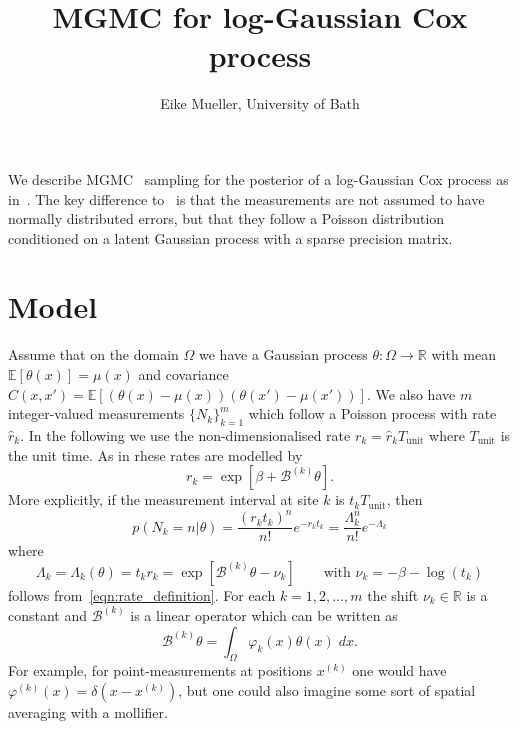 \documentclass[11pt]{article}
\title{MGMC for log-Gaussian Cox process}
\author{Eike Mueller, University of Bath}
\begin{document}
\maketitle
We describe MGMC~\cite{goodman1989multigrid} sampling for the posterior of a log-Gaussian Cox process as in~\cite{diggle1998model}. The key difference to~\cite{kazashi2026multigrid} is that the measurements are not assumed to have normally distributed errors, but that they follow a Poisson distribution conditioned on a latent Gaussian process with a sparse precision matrix.
\section{Model}
Assume that on the domain $\Omega$ we have a Gaussian process $\theta:\Omega\rightarrow \mathbb{R}$ with mean $\mathbb{E}[\theta(x)]=\mu(x)$ and covariance $C(x,x')=\mathbb{E}[(\theta(x)-\mu(x))(\theta(x')-\mu(x'))]$. We also have $m$ integer-valued measurements $\{N_k\}_{k=1}^m$ which follow a Poisson process with rate $\widehat{r}_k$. In the following we use the non-dimensionalised rate $r_k=\widehat{r}_k T_{\text{unit}}$ where $T_{\text{unit}}$ is the unit time. As in \cite{diggle1998model} rhese rates are modelled by
\begin{equation}
    r_k = \exp[\beta + \mathcal{B}^{(k)}\theta]\label{eqn:rate_definition}.
\end{equation}
More explicitly, if the measurement interval at site $k$ is $t_k T_{\text{unit}}$, then  
\begin{equation}
    p(N_k=n|\theta) = \frac{(r_k t_k)^{n}}{n!}e^{-r_k t_k} = \frac{\Lambda_k^{n}}{n!}e^{-\Lambda_k}
\end{equation}
where
\begin{equation}
    \Lambda_k=\Lambda_k(\theta) = t_k r_k = \exp[\mathcal{B}^{(k)}\theta - \nu_k]
    \qquad\text{with $\nu_k = - \beta - \log(t_k)$}
\end{equation}
follows from~\eqref{eqn:rate_definition}.
For each $k=1,2,\dots,m$ the shift $\nu_k\in\mathbb{R}$ is a constant and $\mathcal{B}^{(k)}$ is a linear operator which can be written as
\begin{equation}
\mathcal{B}^{(k)}\theta = \int_\Omega \varphi_k(x)\theta(x)\;dx.\label{eqn:linear_measurement}
\end{equation}
For example, for point-measurements at positions $x^{(k)}$ one would have $\varphi^{(k)}(x) = \delta(x-x^{(k)})$, but one could also imagine some sort of spatial averaging with a mollifier.
\end{document}
